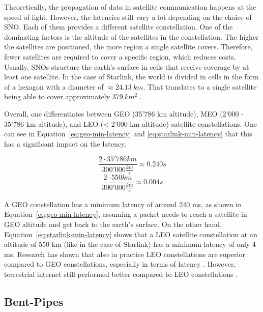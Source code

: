 Theoretically, the propagation of data in satellite communication happens at
the speed of light. However, the latencies still vary a lot depending on the
choice of \ac{SNO}. Each of them provides a different satellite constellation.
One of the dominating factors is the altitude of the satellites in the
constellation. The higher the satellites are positioned, the more region a
single satellite covers. Therefore, fewer satellites are required to cover a
specific region, which reduces costs. Usually, \ac{SNO}s structure the earth's
surface in cells that receive coverage by at least one satellite. In the case
of Starlink, the world is divided in cells in the form of a hexagon with a
diameter of $\approx 24.13~km$. That translates to a single satellite being
able to cover approximately $379~km^2$ \cite{Pekhterev2021}.

Overall, one differentiates between \ac{GEO} (35'786 km altitude), \ac{MEO}
(2'000 - 35'786 km altitude), and \ac{LEO} (< 2'000 km altitude) satellite
constellations. One can see in Equation~\ref{eq:geo-min-latency} and
\ref{eq:starlink-min-latency} that this has a significant impact on the
latency.

\begin{equation}
	\frac{2 \cdot 35'786 km}{300'000 \frac{km}{s}} \approx 0.240 s
	\label{eq:geo-min-latency}
\end{equation}
\begin{equation}
	\frac{2 \cdot 550 km}{300'000 \frac{km}{s}} \approx 0.004 s
	\label{eq:starlink-min-latency}
\end{equation}

A \ac{GEO} constellation has a minimum latency of around 240 ms, as shown in
Equation~\ref{eq:geo-min-latency}, assuming a packet needs to reach a satellite
in GEO altitude and get back to the earth's surface. On the other hand,
Equation~\ref{eq:starlink-min-latency} shows that a \ac{LEO} satellite
constellation at an altitude of 550 km (like in the case of Starlink) has a
minimum latency of only 4 ms. Research has shown that also in practice \ac{LEO}
constellations are superior compared to \ac{GEO} constellations, especially in
terms of latency \cite{DBLP:journals/pacmnet/RamanVCSZ23, Segan2020}. However,
terrestrial internet still performed better compared to \ac{LEO} constellations
\cite{DBLP:conf/www/MohanFCBRMO24, DBLP:conf/infocom/MaCZCML23}.

\subsection{Bent-Pipes} \label{sec:bent-pipes}

